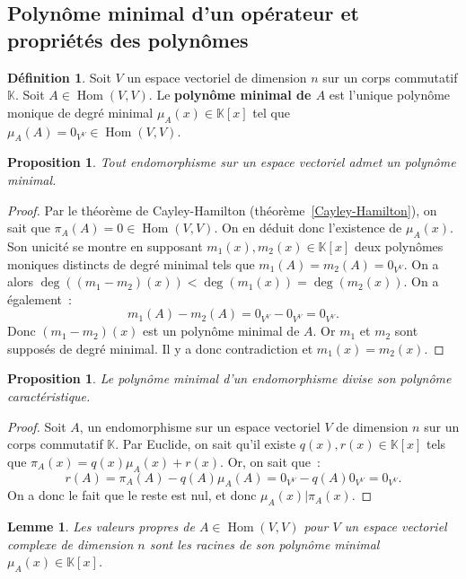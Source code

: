 \documentclass{article}
\DeclareMathOperator{\Hom}{Hom}
\newcommand{\K}{\mathbb K}
\newtheorem{prp}[thm]{Proposition}
\newtheorem{lem}[thm]{Lemme}
\theoremstyle{definition}
\newtheorem{déf}[thm]{Définition}
\theoremstyle{remark}
\begin{document}
	\subsection{Polynôme minimal d'un opérateur et propriétés des polynômes}
		\begin{déf} Soit $V$ un espace vectoriel de dimension $n$ sur un corps commutatif $\K$. Soit $A \in \Hom(V, V)$. Le \textbf{polynôme minimal de $A$}
		est l'unique polynôme monique de degré minimal $\mu_A(x) \in \K[x]$ tel que $\mu_A(A) = 0_{V^V} \in \Hom(V, V)$. \end{déf}

		\begin{prp} Tout endomorphisme sur un espace vectoriel admet un polynôme minimal. \end{prp}

		\begin{proof} Par le théorème de Cayley-Hamilton (théorème~\ref{Cayley-Hamilton}), on sait que $\pi_A(A) = 0 \in \Hom(V, V)$. On en déduit donc l'existence
		de $\mu_A(x)$. Son unicité se montre en supposant $m_1(x), m_2(x) \in \K[x]$ deux polynômes moniques distincts de degré minimal tels que
		$m_1(A) = m_2(A) = 0_{V^V}$. On a alors $\deg((m_1-m_2)(x)) < \deg(m_1(x)) = \deg(m_2(x))$. On a également~:
		\[m_1(A) - m_2(A) = 0_{V^V} - 0_{V^V} = 0_{V^V}.\]
		Donc $(m_1-m_2)(x)$ est un polynôme minimal de $A$. Or $m_1$ et $m_2$ sont supposés de degré minimal. Il y a donc contradiction et $m_1(x) = m_2(x)$.
		\end{proof}

		\begin{prp} Le polynôme minimal d'un endomorphisme divise son polynôme caractéristique. \end{prp}

		\begin{proof} Soit $A$, un endomorphisme sur un espace vectoriel $V$ de dimension $n$ sur un corps commutatif $\K$. Par Euclide, on sait qu'il existe
		$q(x), r(x) \in \K[x]$ tels que $\pi_A(x) = q(x)\mu_A(x) + r(x)$. Or, on sait que~:
		\[r(A) = \pi_A(A) - q(A)\mu_A(A) = 0_{V^V} - q(A)0_{V^V} = 0_{V^V}.\]
		On a donc le fait que le reste est nul, et donc $\mu_A(x) | \pi_A(x)$. \end{proof}

		\begin{lem}\label{valPropreRacineMu} Les valeurs propres de $A \in \Hom(V, V)$ pour $V$ un espace vectoriel complexe de dimension $n$ sont les racines
		de son polynôme minimal $\mu_A(x) \in \K[x]$. \end{lem}
\end{document}
